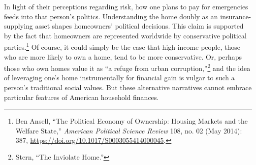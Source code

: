 \documentclass[12pt,oneside]{psthesis}
\begin{document}
In light of their perceptions regarding risk, how one plans to pay for emergencies feeds into that person's politics.
Understanding the home doubly as an insurance-supplying asset shapes homeowners' political decisions.
This claim is supported by the fact that homeowners are represented worldwide by conservative political parties.\footnote{Ben Ansell, ``The Political Economy of Ownership: Housing Markets and the Welfare State,'' \emph{American Political Science Review} 108, no. 02 (May 2014): 387, \url{https://doi.org/10.1017/S0003055414000045}.}
Of course, it could simply be the case that high-income people, those who are more likely to own a home, tend to be more conservative.
Or, perhaps those who own homes value it as ``a refuge from urban corruption,''\footnote{Stern, ``The Inviolate Home.''} and the idea of leveraging one's home instrumentally for financial gain is vulgar to such a person's traditional social values.
But these alternative narratives cannot embrace particular features of American household finances.
\end{document}
